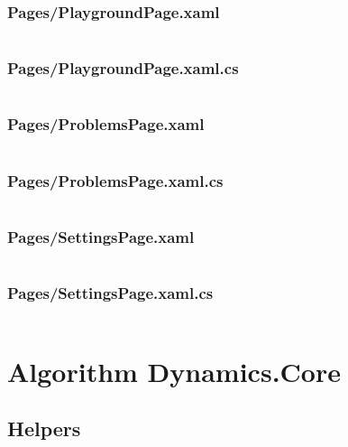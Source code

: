 \documentclass[a4paper]{report}
\begin{document}
\subsubsection{Pages/PlaygroundPage.xaml}

\inputminted{xml}{"../src/Algorithm Dynamics/Pages/PlaygroundPage.xaml"}

\subsubsection{Pages/PlaygroundPage.xaml.cs}

\inputminted{csharp}{"../src/Algorithm Dynamics/Pages/PlaygroundPage.xaml.cs"}

\subsubsection{Pages/ProblemsPage.xaml}

\inputminted{xml}{"../src/Algorithm Dynamics/Pages/ProblemsPage.xaml"}

\subsubsection{Pages/ProblemsPage.xaml.cs}

\inputminted{csharp}{"../src/Algorithm Dynamics/Pages/ProblemsPage.xaml.cs"}

\subsubsection{Pages/SettingsPage.xaml}

\inputminted{xml}{"../src/Algorithm Dynamics/Pages/SettingsPage.xaml"}

\subsubsection{Pages/SettingsPage.xaml.cs}

\inputminted{csharp}{"../src/Algorithm Dynamics/Pages/SettingsPage.xaml.cs"}

\section{Algorithm Dynamics.Core}

\subsection{Helpers}
\end{document}
